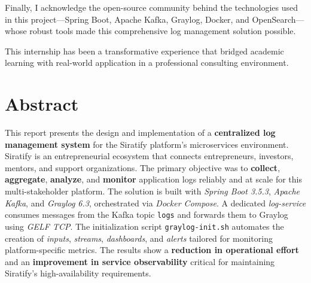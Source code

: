 \documentclass[12pt,a4paper]{report}
\begin{document}
Finally, I acknowledge the open-source community behind the technologies used in this project—Spring Boot, Apache Kafka, Graylog, Docker, and OpenSearch—whose robust tools made this comprehensive log management solution possible.

This internship has been a transformative experience that bridged academic learning with real-world application in a professional consulting environment.


\chapter*{Abstract}
This report presents the design and implementation of a \textbf{centralized log management system} for the Siratify platform's microservices environment. Siratify is an entrepreneurial ecosystem that connects entrepreneurs, investors, mentors, and support organizations. The primary objective was to \textbf{collect}, \textbf{aggregate}, \textbf{analyze}, and \textbf{monitor} application logs reliably and at scale for this multi-stakeholder platform. The solution is built with \textit{Spring Boot 3.5.3}, \textit{Apache Kafka}, and \textit{Graylog 6.3}, orchestrated via \textit{Docker Compose}. A dedicated \textit{log-service} consumes messages from the Kafka topic \texttt{logs} and forwards them to Graylog using \textit{GELF TCP}. The initialization script \texttt{graylog-init.sh} automates the creation of \textit{inputs}, \textit{streams}, \textit{dashboards}, and \textit{alerts} tailored for monitoring platform-specific metrics. The results show a \textbf{reduction in operational effort} and an \textbf{improvement in service observability} critical for maintaining Siratify's high-availability requirements.
\end{document}
